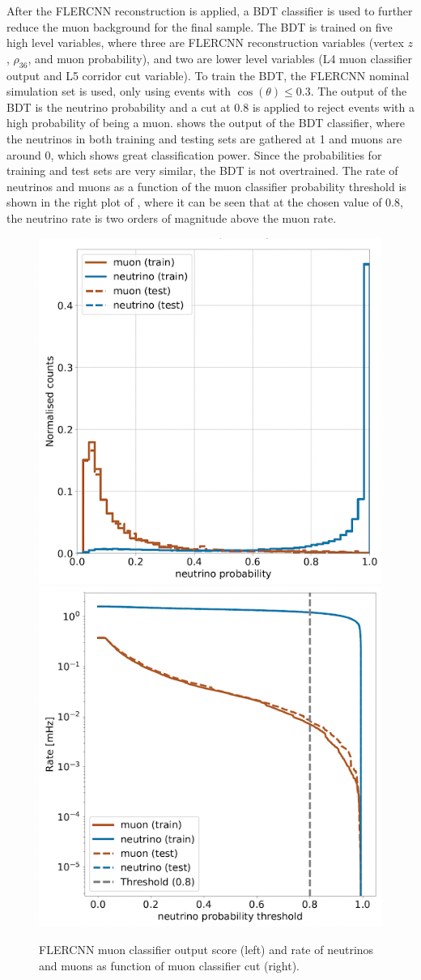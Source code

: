 After the FLERCNN reconstruction is applied, a BDT classifier is used to further reduce the muon background for the final sample. The BDT is trained on five high level variables, where three are FLERCNN reconstruction variables (vertex $z$, $\rho_{36}$, and muon probability), and two are lower level variables (L4 muon classifier output and L5 corridor cut variable). To train the BDT, the FLERCNN nominal simulation set is used, only using events with $\cos(\theta)\leq 0.3$. The output of the BDT is the neutrino probability and a cut at 0.8 is applied to reject events with a high probability of being a muon.  shows the output of the BDT classifier, where the neutrinos in both training and testing sets are gathered at 1 and muons are around 0, which shows great classification power. Since the probabilities for training and test sets are very similar, the BDT is not overtrained. The rate of neutrinos and muons as a function of the muon classifier probability threshold is shown in the right plot of , where it can be seen that at the chosen value of 0.8, the neutrino rate is two orders of magnitude above the muon rate.

\begin{figure}
\includegraphics[width=0.44\linewidth]{figures/simulation_and_processing/flercnn/flercnn_muon_classifier.png}
\includegraphics[width=0.44\linewidth]{figures/simulation_and_processing/flercnn/flercnn_muon_classifier_rate_vs_threshold.png}
\caption[FLERCNN muon classifier probability distributions]{FLERCNN muon classifier output score (left) and rate of neutrinos and muons as function of muon classifier cut (right).}
\end{figure}


